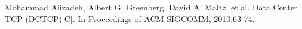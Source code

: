 \begin{thebibliography}{99}
Mohammad Alizadeh, Albert G. Greenberg, David A. Maltz, et al. Data Center TCP (DCTCP)[C]. In Proceedings of ACM SIGCOMM, 2010:63-74.
\end{thebibliography}